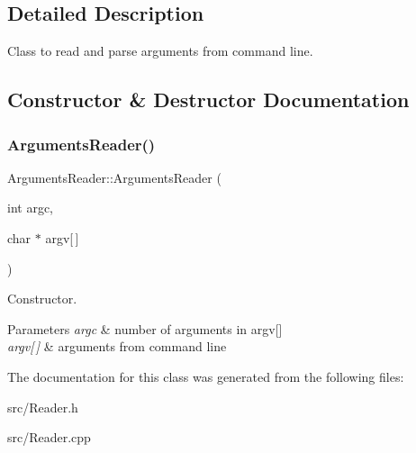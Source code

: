 

\subsection{Detailed Description}
Class to read and parse arguments from command line. 

\subsection{Constructor \& Destructor Documentation}
\mbox{\label{classArgumentsReader_adf40be74238d9297594ee6448c7d97f1}} 
\subsubsection{\texorpdfstring{Arguments\+Reader()}{ArgumentsReader()}}
{\footnotesize\ttfamily Arguments\+Reader\+::\+Arguments\+Reader (\begin{DoxyParamCaption}\item[{int}]{argc,  }\item[{char $\ast$}]{argv\mbox{[}$\,$\mbox{]} }\end{DoxyParamCaption})}



Constructor. 


\begin{DoxyParams}{Parameters}
{\em argc} & number of arguments in argv\mbox{[}\mbox{]} \\
\hline
{\em argv\mbox{[}$\,$\mbox{]}} & arguments from command line \\
\hline
\end{DoxyParams}


The documentation for this class was generated from the following files\+:\begin{DoxyCompactItemize}
\item 
src/Reader.\+h\item 
src/Reader.\+cpp\end{DoxyCompactItemize}
